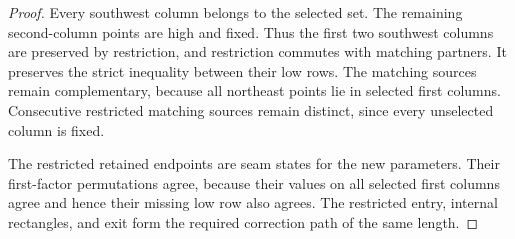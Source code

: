 \documentclass[11pt,oneside]{report}
\theoremstyle{definition}
\numberwithin{equation}{section}
\begin{document}
\begin{proof}
Every southwest column belongs to the selected set. The remaining
second-column points are high and fixed. Thus the first two southwest
columns are preserved by restriction, and restriction commutes with
matching partners. It preserves the strict inequality between their
low rows. The matching sources remain complementary, because all
northeast points lie in selected first columns. Consecutive restricted
matching sources remain distinct, since every unselected column is fixed.

The restricted retained endpoints are seam states for the new
parameters. Their first-factor permutations agree, because their values
on all selected first columns agree and hence their missing low row
also agrees. The restricted entry, internal rectangles, and exit form
the required correction path of the same length.
\end{proof}
\end{document}
